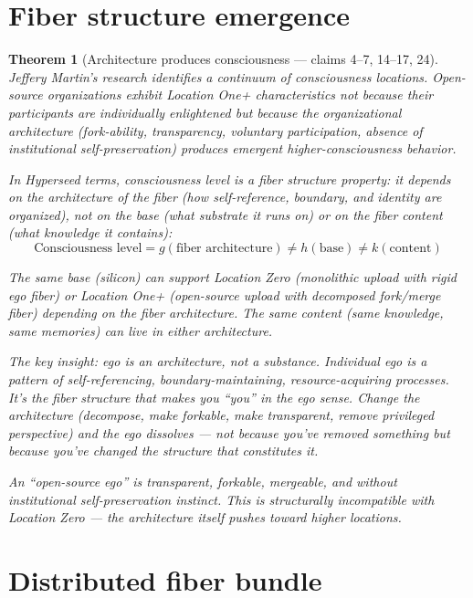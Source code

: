 \documentclass[11pt,a4paper]{article}
\newtheorem{theorem}[definition]{Theorem}
\begin{document}
\section{Fiber structure emergence}
\label{sec:emergence}

\begin{theorem}[Architecture produces consciousness --- claims 4--7, 14--17, 24]
\label{thm:emergence}
Jeffery Martin's research identifies a continuum of consciousness locations.
Open-source organizations exhibit Location One+ characteristics not because
their participants are individually enlightened but because the organizational
architecture (fork-ability, transparency, voluntary participation, absence
of institutional self-preservation) produces emergent higher-consciousness
behavior.

In Hyperseed terms, consciousness level is a \emph{fiber structure
property}: it depends on the architecture of the fiber (how self-reference,
boundary, and identity are organized), not on the base (what substrate it
runs on) or on the fiber content (what knowledge it contains):
\[
  \text{Consciousness level} = g(\text{fiber architecture})
  \neq h(\text{base}) \neq k(\text{content})
\]

The same base (silicon) can support Location Zero (monolithic upload with
rigid ego fiber) or Location One+ (open-source upload with decomposed
fork/merge fiber) depending on the fiber architecture. The same content
(same knowledge, same memories) can live in either architecture.

The key insight: ego is an architecture, not a substance. Individual ego
is a pattern of self-referencing, boundary-maintaining, resource-acquiring
processes. It's the fiber structure that makes you ``you'' in the ego
sense. Change the architecture (decompose, make forkable, make transparent,
remove privileged perspective) and the ego dissolves --- not because
you've removed something but because you've changed the structure that
constitutes it.

An ``open-source ego'' is transparent, forkable, mergeable, and without
institutional self-preservation instinct. This is structurally
incompatible with Location Zero --- the architecture itself pushes
toward higher locations.
\end{theorem}


\section{Distributed fiber bundle}
\label{sec:distributed}
\end{document}
